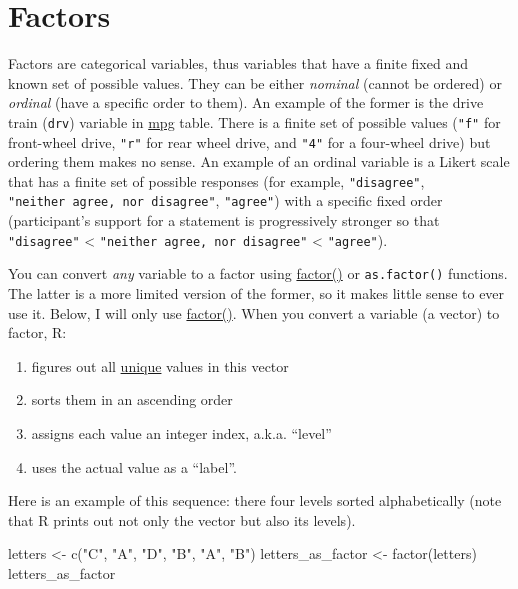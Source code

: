 \documentclass[
]{book}
\newenvironment{Shaded}{\begin{snugshade}}{\end{snugshade}}
\newcommand{\FunctionTok}[1]{\textcolor[rgb]{0.00,0.00,0.00}{#1}}
\newcommand{\NormalTok}[1]{#1}
\newcommand{\OtherTok}[1]{\textcolor[rgb]{0.56,0.35,0.01}{#1}}
\newcommand{\StringTok}[1]{\textcolor[rgb]{0.31,0.60,0.02}{#1}}
\providecommand{\tightlist}{%
  \setlength{\itemsep}{0pt}\setlength{\parskip}{0pt}}
\begin{document}
\hypertarget{factors}{%
\section{Factors}\label{factors}}

Factors are categorical variables, thus variables that have a finite fixed and known set of possible values. They can be either \emph{nominal} (cannot be ordered) or \emph{ordinal} (have a specific order to them). An example of the former is the drive train (\texttt{drv}) variable in \href{https://ggplot2.tidyverse.org/reference/mpg.html}{mpg} table. There is a finite set of possible values (\texttt{"f"} for front-wheel drive, \texttt{"r"} for rear wheel drive, and \texttt{"4"} for a four-wheel drive) but ordering them makes no sense. An example of an ordinal variable is a Likert scale that has a finite set of possible responses (for example, \texttt{"disagree"}, \texttt{"neither\ agree,\ nor\ disagree"}, \texttt{"agree"}) with a specific fixed order (participant's support for a statement is progressively stronger so that \texttt{"disagree"} \textless{} \texttt{"neither\ agree,\ nor\ disagree"} \textless{} \texttt{"agree"}).

You can convert \emph{any} variable to a factor using \href{https://stat.ethz.ch/R-manual/R-devel/library/base/html/factor.html}{factor()} or \texttt{as.factor()} functions. The latter is a more limited version of the former, so it makes little sense to ever use it. Below, I will only use \href{https://stat.ethz.ch/R-manual/R-devel/library/base/html/factor.html}{factor()}. When you convert a variable (a vector) to factor, R:

\begin{enumerate}
\def\labelenumi{\arabic{enumi}.}
\tightlist
\item
  figures out all \href{https://stat.ethz.ch/R-manual/R-devel/library/base/html/unique.html}{unique} values in this vector
\item
  sorts them in an ascending order
\item
  assigns each value an integer index, a.k.a. ``level''
\item
  uses the actual value as a ``label''.
\end{enumerate}

Here is an example of this sequence: there four levels sorted alphabetically (note that R prints out not only the vector but also its levels).

\begin{Shaded}
\begin{Highlighting}[]
\NormalTok{letters }\OtherTok{\textless{}{-}} \FunctionTok{c}\NormalTok{(}\StringTok{"C"}\NormalTok{, }\StringTok{"A"}\NormalTok{, }\StringTok{"D"}\NormalTok{, }\StringTok{"B"}\NormalTok{, }\StringTok{"A"}\NormalTok{, }\StringTok{"B"}\NormalTok{)}
\NormalTok{letters\_as\_factor }\OtherTok{\textless{}{-}} \FunctionTok{factor}\NormalTok{(letters)}
\NormalTok{letters\_as\_factor}
\end{Highlighting}
\end{Shaded}
\end{document}
